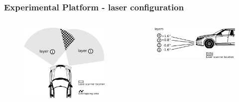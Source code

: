 \documentclass{beamer}
\begin{document}
	\begin{frame}
		\frametitle{Experimental Platform - laser configuration}	

		 \begin{columns}[t]
		  \begin{column}{5cm}

		  \begin{figure}[h]
			\center
			\includegraphics[scale=0.27]{../img/fig:demonstrator:superior:overlap}
		  \end{figure}   

		  \end{column}

		  \begin{column}{5cm}
		 \begin{figure}[h]
			\center
			\includegraphics[scale=0.27]{../img/fig:demonstrator:lateral}
		\end{figure}		  
		  \end{column}
		 \end{columns} 	
	
	\end{frame}
\end{document}

